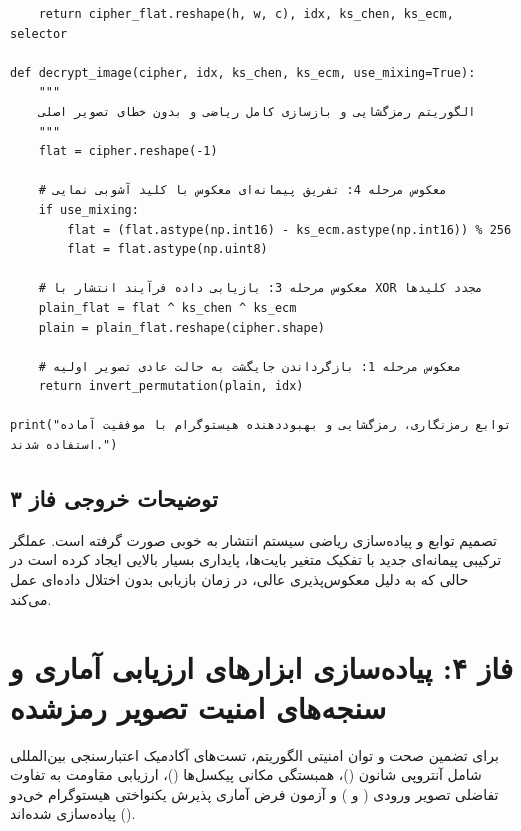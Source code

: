 \begin{latin}
\begin{verbatim}
    return cipher_flat.reshape(h, w, c), idx, ks_chen, ks_ecm, selector

def decrypt_image(cipher, idx, ks_chen, ks_ecm, use_mixing=True):
    """
    الگوریتم رمزگشایی و بازسازی کامل ریاضی و بدون خطای تصویر اصلی
    """
    flat = cipher.reshape(-1)
    
    # معکوس مرحله 4: تفریق پیمانه‌ای معکوس با کلید آشوبی نمایی
    if use_mixing:
        flat = (flat.astype(np.int16) - ks_ecm.astype(np.int16)) % 256
        flat = flat.astype(np.uint8)
        
    # معکوس مرحله 3: بازیابی داده فرآیند انتشار با XOR مجدد کلیدها
    plain_flat = flat ^ ks_chen ^ ks_ecm
    plain = plain_flat.reshape(cipher.shape)
    
    # معکوس مرحله 1: بازگرداندن جایگشت به حالت عادی تصویر اولیه
    return invert_permutation(plain, idx)

print("توابع رمزنگاری، رمزگشایی و بهبوددهنده هیستوگرام با موفقیت آماده استفاده شدند.")
\end{verbatim}
\end{latin}

\subsection*{توضیحات خروجی فاز ۳}
تصميم توابع و پیاده‌سازی ریاضی سیستم انتشار به خوبی صورت گرفته است. عملگر ترکیبی پیمانه‌ای جدید با تفکیک متغیر بایت‌ها، پایداری بسیار بالایی ایجاد کرده است در حالی که به دلیل معکوس‌پذیری عالی، در زمان بازیابی بدون اختلال داده‌ای عمل می‌کند.

\section{فاز ۴: پیاده‌سازی ابزارهای ارزیابی آماری و سنجه‌های امنیت تصویر رمزشده}
برای تضمین صحت و توان امنیتی الگوریتم، تست‌های آکادمیک اعتبارسنجی بین‌المللی شامل آنتروپی شانون ()، همبستگی مکانی پیکسل‌ها ()، ارزیابی مقاومت به تفاوت تفاضلی تصویر ورودی ( و ) و آزمون فرض آماری پذیرش یکنواختی هیستوگرام خی‌دو () پیاده‌سازی شده‌اند.

